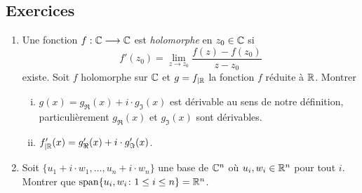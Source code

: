 









\subsection*{Exercices} 

\begin{enumerate}
\item Une fonction $f:\mathbb{C} \longrightarrow \mathbb{C}$ est \emph{holomorphe} en $z_0 \in \mathbb{C}$ si
  \begin{displaymath}
    f'(z_0) = \lim_{z \rightarrow z_0} \frac{f(z) - f(z_0)}{z - z_0} 
  \end{displaymath}
existe. Soit $f$ holomorphe sur $\mathbb{C}$ et $g = f_{|\mathbb{R}}$ la fonction $f$ réduite à $\mathbb{R}$. 
 Montrer 
\begin{enumerate}[i)]
\item  $g(x) = g_\Re(x) + i \cdot g_\Im(x)$ est dérivable au  sens de notre définition, particulièrement $g_\Re(x)$ et $ g_\Im(x)$ sont dérivables. 
\item $f'_{| \mathbb{R}} (x) = g'_\Re(x) + i \cdot g'_\Im(x)$. 
\end{enumerate}
\item Soit $\{u_1+ i \cdot w_1,\dots,u_n + i \cdot w_n\}$ une base de $\mathbb{C}^n$ où $u_i,w_i \in \mathbb{R}^n$  pour tout $i$. Montrer que $\operatorname{span}\{u_i, w_i \colon 1 \leq i \leq n\} = \mathbb{R}^n$. \label{el:item:5}
\end{enumerate}






